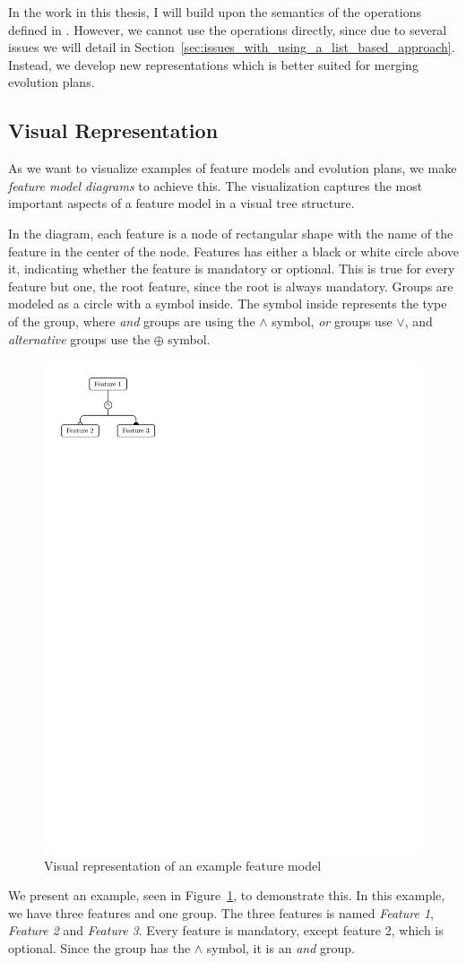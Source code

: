 \documentclass[a4paper,english]{ifimaster}
\begin{document}
In the work in this thesis, I will build upon the semantics of the operations defined in \cite{cite:consistency_preserving_evolution_planning}. However, we cannot use the operations directly, since due to several issues we will detail in Section~\vref{sec:issues_with_using_a_list_based_approach}. Instead, we develop new representations which is better suited for merging evolution plans.

\subsection{Visual Representation}%
\label{sub:visual_representation}

As we want to visualize examples of feature models and evolution plans, we make \textit{feature model diagrams} to achieve this. The visualization captures the most important aspects of a feature model in a visual tree structure.

In the diagram, each feature is a node of rectangular shape with the name of the feature in the center of the node. Features has either a black or white circle above it, indicating whether the feature is mandatory or optional. This is true for every feature but one, the root feature, since the root is always mandatory. Groups are modeled as a circle with a symbol inside. The symbol inside represents the type of the group, where \textit{and} groups are using the $\land$ symbol, \textit{or} groups use $\lor$, and \textit{alternative} groups use the $\oplus$ symbol.

\begin{figure}[htpb]
  \centering
  \includegraphics[width=0.4\linewidth]{visual_example.pdf}
  \caption{Visual representation of an example feature model}%
  \label{fig:visual_example}
\end{figure}

We present an example, seen in Figure~\ref{fig:visual_example}, to demonstrate this. In this example, we have three features and one group. The three features is named \textit{Feature 1}, \textit{Feature 2} and \textit{Feature 3}. Every feature is mandatory, except feature 2, which is optional. Since the group has the $\land$ symbol, it is an \textit{and} group.
\end{document}
